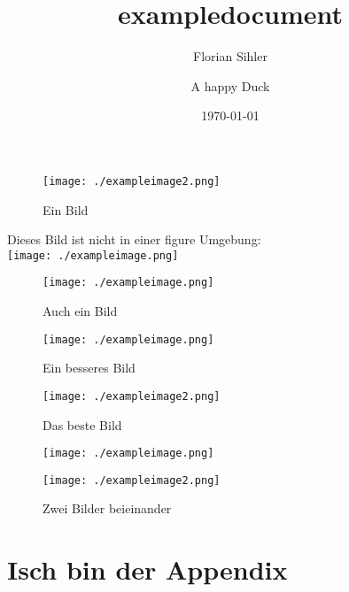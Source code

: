 \documentclass{article}
\title{exampledocument}
\author{Florian Sihler \and A happy Duck}
\date{\today}
\begin{document}
    
\maketitle

\listoffigures

\begin{figure}
    \texttt{[image: ./exampleimage2.png]}
    \caption{Ein Bild}
\end{figure}

Dieses Bild ist nicht in einer figure Umgebung:\bigskip\\
\texttt{[image: ./exampleimage.png]}

\begin{figure}[t]
    \texttt{[image: ./exampleimage.png]}
    \caption{Auch ein Bild}
\end{figure}

\blinddocument

\begin{figure}[t]
    \texttt{[image: ./exampleimage.png]}
    \caption{Ein besseres Bild}
\end{figure}


\begin{figure}[t]
    \texttt{[image: ./exampleimage2.png]}
    \caption{Das beste Bild}
\end{figure}


\begin{figure}[t]
    \begin{minipage}[t]{0.48\linewidth}
        \texttt{[image: ./exampleimage.png]}
    \end{minipage}
    \begin{minipage}[t]{0.48\linewidth}
        \texttt{[image: ./exampleimage2.png]}
    \end{minipage}
    \caption{Zwei Bilder beieinander}
\end{figure}

\blindtext

\clearpage\appendix
\section{Isch bin der Appendix}

\mirrorimages
\end{document}
